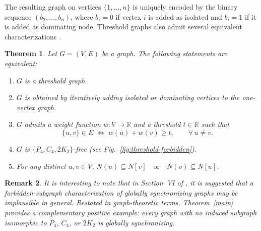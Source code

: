 \documentclass[11pt,reqno]{amsart}
\newtheorem{theorem}{Theorem}[section]
\newtheorem{remark}[theorem]{Remark}
\theoremstyle{definition}
\begin{document}
The resulting graph on vertices $\{1,\dots,n\}$ is uniquely encoded by the
binary sequence $(b_2,\dots,b_n)$, where $b_i=0$ if vertex $i$ is added as
isolated and $b_i=1$ if it is added as dominating node.
Threshold graphs also admit several equivalent characterizations \cite{ChvatalHammer1977}.
\begin{theorem}\label{characterization}
Let $G = (V,E)$ be a graph. The following statements are equivalent:
\begin{enumerate}
    \item[(i)] $G$ is a threshold graph.
    \item[(ii)] $G$ is obtained by iteratively adding isolated or dominating vertices to the one-vertex graph.
    \item[(iii)] $G$ admits a weight function $w : V \to \mathbb{R}$ and a threshold $t \in \mathbb{R}$ such that
\[
\{u,v\} \in E
\;\Longleftrightarrow\;
w(u) + w(v) \ge t,
\qquad \forall\, u \ne v .
\]

    \item[(iv)] $G$ is $\{P_4, C_4, 2K_2\}$-free (see Fig.~\ref{fig:threshold-forbidden}).
    \item[(v)] 
    For any distinct $u,v \in V$, $
        N(u) \subseteq N[v] \quad \text{or} \quad N(v) \subseteq N[u].$
\end{enumerate}
\end{theorem}
\begin{remark}
    It is interesting to note that in Section~VI of \cite{canale2022weighted}, it is suggested that a forbidden-subgraph characterization of globally synchronizing graphs may be implausible in general. Restated in graph-theoretic terms, Theorem~\ref{main} provides a complementary positive example: every graph with no induced subgraph isomorphic to \(P_4\), \(C_4\), or \(2K_2\) is globally synchronizing.
\end{remark}
\end{document}
